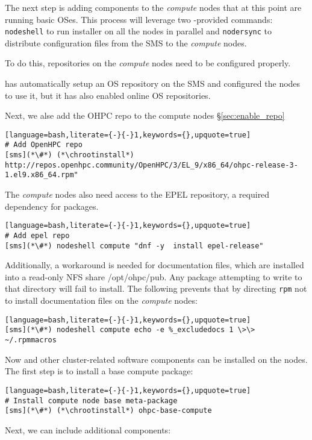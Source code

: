 
The next step is adding \OHPC{} components to the {\em compute} nodes that at this
point are running basic OSes.  This process will leverage two \Confluent{}-provided
commands: \texttt{nodeshell} to run \texttt{\pkgmgr{}} installer on all the
nodes in parallel  and \texttt{nodersync} to distribute configuration files from the
SMS to the {\em compute} nodes.

\noindent To do this, repositories on the {\em compute} nodes need to be configured
properly.

\Confluent{} has automatically setup an  OS repository on the SMS and configured the
nodes to use it, but it has  also enabled online OS repositories.


\noindent Next, we alse add the OHPC repo to the compute nodes \S\ref{sec:enable_repo}

\begin{lstlisting}[language=bash,literate={-}{-}1,keywords={},upquote=true]
# Add OpenHPC repo 
[sms](*\#*) (*\chrootinstall*) http://repos.openhpc.community/OpenHPC/3/EL_9/x86_64/ohpc-release-3-1.el9.x86_64.rpm"
\end{lstlisting}

The {\em compute} nodes also need access to the EPEL repository, a required
dependency for \OHPC{} packages. 

\begin{lstlisting}[language=bash,literate={-}{-}1,keywords={},upquote=true]
# Add epel repo
[sms](*\#*) nodeshell compute "dnf -y  install epel-release"

\end{lstlisting}


\noindent Additionally, a workaround is needed for \OHPC{} documentation files,
which are installed into a read-only NFS share /opt/ohpc/pub. Any package
attempting to write to that directory will fail to install. The following
prevents that by directing \texttt{rpm} not to install documentation files on
the {\em compute} nodes:

\begin{lstlisting}[language=bash,literate={-}{-}1,keywords={},upquote=true]
[sms](*\#*) nodeshell compute echo -e %_excludedocs 1 \>\> ~/.rpmmacros
\end{lstlisting}

\noindent Now \OHPC{} and other cluster-related software components can be
installed on the nodes. The first step is to install a base compute package:
\begin{lstlisting}[language=bash,literate={-}{-}1,keywords={},upquote=true]
# Install compute node base meta-package
[sms](*\#*) (*\chrootinstall*) ohpc-base-compute
\end{lstlisting}

\noindent Next, we can include additional components:
